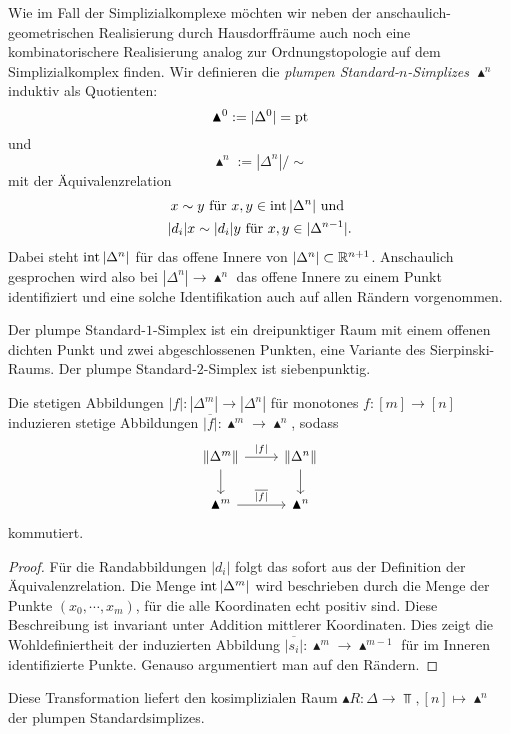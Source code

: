 \begin{bem} \label{clumsy-real}
  Wie im Fall der Simplizialkomplexe möchten wir neben der
  anschaulich-geometrischen Realisierung durch Hausdorffräume auch
  noch eine kombinatorischere Realisierung analog zur
  Ordnungstopologie auf dem Simplizialkomplex finden. Wir definieren
  die \emph{plumpen Standard-$n$-Simplizes $\blacktriangle^n$}
  induktiv als Quotienten:
  \[ \blacktriangle^0 := |\Delta^0| = \operatorname{pt} \]
  und
  \[ \blacktriangle^n := |\Delta^n| / \sim \]
  mit der Äquivalenzrelation
  \begin{gather*}
    x \sim y \text{ für } x, y \in \operatorname{int} |\Delta^n| \text{ und }  \\
    |d_i| x \sim |d_i| y \text{ für } x, y \in |\Delta^{n-1}|.
  \end{gather*}
  Dabei steht $\operatorname{int} |\Delta^n|$ für das offene Innere von $|\Delta^n|
  \subset \mathbb{R}^{n+1}$. Anschaulich gesprochen wird also bei $|\Delta^n|
  \to \blacktriangle^n$ das offene Innere zu einem Punkt identifiziert
  und eine solche Identifikation auch auf allen Rändern vorgenommen.
\end{bem}
\begin{bsp}
  Der plumpe Standard-$1$-Simplex ist ein dreipunktiger Raum mit einem
  offenen dichten Punkt und zwei abgeschlossenen Punkten, eine
  Variante des Sierpinski-Raums. Der plumpe Standard-$2$-Simplex ist
  siebenpunktig.
\end{bsp}
\begin{lemma}
  Die stetigen Abbildungen $|f|: |\Delta^m| \to |\Delta^n|$ für
  monotones $f: [m] \to [n]$ induzieren stetige Abbildungen
  $\overline{|f|}: \blacktriangle^m \to \blacktriangle^n$, sodass
  \[ \begin{tikzcd}
    \| \Delta^m \| \arrow{d} \arrow{r}{|f|} & \| \Delta^n \| \arrow{d} \\
    \blacktriangle^m \arrow{r}{\overline{|f|}} & \blacktriangle^n
  \end{tikzcd} \]
  kommutiert.
\end{lemma}
\begin{proof}
  Für die Randabbildungen $|d_i|$ folgt das sofort aus der Definition
  der Äquivalenzrelation. Die Menge $\operatorname{int} |\Delta^m|$ wird
  beschrieben durch die Menge der Punkte $(x_0, \cdots, x_m)$, für die
  alle Koordinaten echt positiv sind. Diese Beschreibung ist invariant
  unter Addition mittlerer Koordinaten. Dies zeigt die
  Wohldefiniertheit der induzierten Abbildung $\overline{|s_i|}:
  \blacktriangle^m \to \blacktriangle^{m-1}$ für im Inneren
  identifizierte Punkte. Genauso argumentiert man auf den Rändern.
\end{proof}
Diese Transformation liefert den kosimplizialen Raum $\blacktriangle
R: \Delta \to \Top, [n] \mapsto \blacktriangle^n$ der plumpen
Standardsimplizes.

